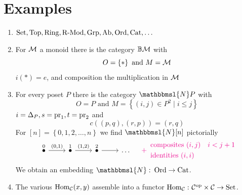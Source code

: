     \section{Examples}
        \begin{enumerate}[label=\roman*)]
            \item $\operatorname{Set}, \operatorname{Top}, \operatorname{Ring}, \operatorname{R-Mod}, \operatorname{Grp}, \operatorname{Ab}, \operatorname{Ord}, \operatorname{Cat}, \ldots$
            \item For $\mathcal{M}$ a monoid there is the category $\mathbb{B}\mathcal{M}$ with 
                \begin{equation*}
                    O = \left\{*\right\} \text{ and } M = \mathcal{M}
                \end{equation*}
                $i(*) = e$, and composition the multiplication in $\mathcal{M}$
            \item For every poset $P$ there is the category $\mathbbmsl{N}P$ with
                \begin{equation*}
	                   O = P \text{ and } M = \left\{(i, j) \in P^2 \mid i \leq j \right\}
                \end{equation*}
                $i = \Delta_P, s = \operatorname{pr}_1, t = \operatorname{pr}_2$ and
                \begin{equation*}
                    c((p, q), (r, p)) = (r, q)
                \end{equation*}
                For $[n] = \left\{ 0, 1, 2, \ldots, n\right\}$ we find $\mathbbmsl{N}[n]$ pictorially
                \begin{equation*}
                    \begin{tikzcd}
                        \overset{0}{\bullet} \arrow[r, "{(0, 1)}"] & \overset{1}{\bullet} \arrow[r, "{(1,2)}"] & \overset{2}{\bullet} \arrow[r] & \ldots
                    \end{tikzcd}
                    \color{magenta}
                    \quad + \;
                    \begin{aligned}
                        &\text{composites } (i, j) \quad i < j + 1 \\
                        &\text{identities } (i, i)
                    \end{aligned}
                \end{equation*}
                We obtain an embedding $\mathbbmsl{N} \,\colon \Ord \to \Cat$.
            \item The various $\operatorname{Hom}_{\mathcal{C}}(x, y)$ assemble into a functor $\operatorname{Hom}_{\mathcal{C}} \,\colon \mathcal{C}^{\operatorname{op}} \times \mathcal{C} \to \operatorname{Set}$.
        \end{enumerate}
